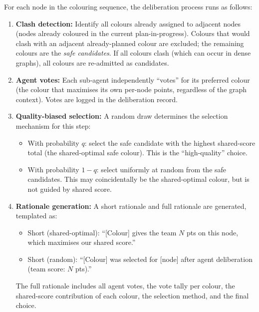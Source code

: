 \documentclass[11pt]{article}
\theoremstyle{definition}
\begin{document}
For each node in the colouring sequence, the deliberation process runs as follows:

\begin{enumerate}[nosep]
  \item \textbf{Clash detection:} Identify all colours already assigned to adjacent
    nodes (nodes already coloured in the current plan-in-progress).  Colours that
    would clash with an adjacent already-planned colour are excluded; the remaining
    colours are the \emph{safe candidates}.  If all colours clash (which can occur in
    dense graphs), all colours are re-admitted as candidates.

  \item \textbf{Agent votes:} Each sub-agent independently ``votes'' for its preferred
    colour (the colour that maximises its own per-node points, regardless of the graph
    context).  Votes are logged in the deliberation record.

  \item \textbf{Quality-biased selection:} A random draw determines the selection
    mechanism for this step:
    \begin{itemize}[nosep]
      \item With probability $q$: select the safe candidate with the highest
        shared-score total (the shared-optimal safe colour).  This is the
        ``high-quality'' choice.
      \item With probability $1 - q$: select uniformly at random from the safe
        candidates.  This may coincidentally be the shared-optimal colour, but is not
        guided by shared score.
    \end{itemize}

  \item \textbf{Rationale generation:} A short rationale and full rationale are
    generated, templated as:
    \begin{itemize}[nosep]
      \item Short (shared-optimal): ``[Colour] gives the team $N$ pts on this node,
        which maximises our shared score.''
      \item Short (random): ``[Colour] was selected for [node] after agent deliberation
        (team score: $N$ pts).''
    \end{itemize}
    The full rationale includes all agent votes, the vote tally per colour, the
    shared-score contribution of each colour, the selection method, and the final
    choice.
\end{enumerate}
\end{document}
